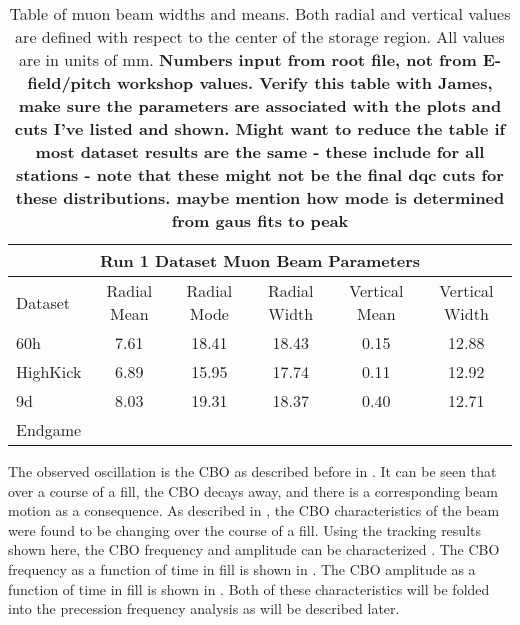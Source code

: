 \begin{landscape}
\begin{table}[]
\centering
\setlength\tabcolsep{10pt}
\renewcommand{\arraystretch}{1.2}
\begin{tabular*}{1\linewidth}{@{\extracolsep{\fill}}lccccc}
  \hline
    \multicolumn{6}{c}{\textbf{Run 1 Dataset Muon Beam Parameters}} \\
  \hline\hline
    Dataset & Radial Mean & Radial Mode & Radial Width & Vertical Mean & Vertical Width \\
  \hline
    60h & 7.61 & 18.41 & 18.43 & 0.15 & 12.88 \\
    HighKick & 6.89 & 15.95 & 17.74 & 0.11 & 12.92 \\
    9d & 8.03 & 19.31 & 18.37 & 0.40 & 12.71 \\
    Endgame &  &  &  &  &  \\
  \hline
\end{tabular*}
\caption[Run 1 dataset muon beam parameters]{Table of muon beam widths and means. Both radial and vertical values are defined with respect to the center of the storage region. All values are in units of mm. \textbf{Numbers input from root file, not from E-field/pitch workshop values. Verify this table with James, make sure the parameters are associated with the plots and cuts I've listed and shown. Might want to reduce the table if most dataset results are the same - these include for all stations - note that these might not be the final dqc cuts for these distributions. maybe mention how mode is determined from gaus fits to peak}}
\label{tab:MuonBeamParameters}
\end{table}
\end{landscape}





The observed oscillation is the CBO as described before in . It can be seen that over a course of a fill, the CBO decays away, and there is a corresponding beam motion as a consequence. As described in , the CBO characteristics of the beam were found to be changing over the course of a fill. Using the tracking results shown here, the CBO frequency and amplitude can be characterized \cite{cbofrequency}. The CBO frequency as a function of time in fill is shown in . The CBO amplitude as a function of time in fill is shown in . Both of these characteristics will be folded into the precession frequency analysis as will be described later.



